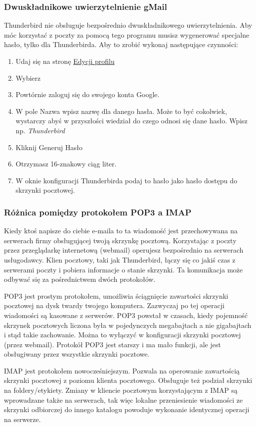 \subsubsection{Dwuskładnikowe uwierzytelnienie gMail}
Thunderbird nie obsługuje bezpośrednio dwuskładnikowego uwierzytelnienia. Aby móc korzystać z poczty za pomocą tego programu musisz wygenerować specjalne hasło, tylko dla Thunderbirda. Aby to zrobić wykonaj następujące czynności:
\begin{enumerate}
\item Udaj się na stronę \href{https://www.google.com/settings/personalinfo}{Edycji profilu}
\item Wybierz 
\item Powtórnie zaloguj się do swojego konta Google.
\item W pole \textcolor{ubuntu_orange}{Nazwa} wpisz nazwę dla danego hasła. Może to być cokolwiek, wystarczy abyś w przyszłości wiedział do czego odnosi się dane hasło. Wpisz np. \textit{Thunderbird}
\item Kliknij \textcolor{ubuntu_orange}{Generuj Hasło}
\item Otrzymasz 16-znakowy ciąg liter. 
\item W oknie konfiguracji Thunderbirda podaj to hasło jako hasło dostępu do skrzynki pocztowej.
\end{enumerate}

\subsubsection{Różnica pomiędzy protokołem POP3 a IMAP}
Kiedy ktoś napisze do ciebie e-maila to ta wiadomość jest przechowywana na serwerach firmy obsługującej twoją skrzynkę pocztową. Korzystając z poczty przez przeglądarkę internetową (webmail) operujesz bezpośrednio na serwerach usługodawcy. Klien pocztowy, taki jak Thunderbird, łączy się co jakiś czas z serwerami poczty i pobiera informacje o stanie skrzynki. Ta komunikacja może odbywać się za pośrednictwem dwóch protokołów.

POP3 jest prostym protokołem, umożliwia ściągnięcie zawartości skrzynki pocztowej na dysk twardy twojego komputera. Zazwyczaj po tej operacji wiadomości są kasowane z serwerów. POP3 powstał w czasach, kiedy pojemność skrzynek pocztowych liczona była w pojedynczych megabajtach a nie gigabajtach i stąd takie zachowanie. Można to wyłączyć w konfiguracji skrzynki pocztowej (przez webmail). Protokół POP3 jest starszy i ma mało funkcji, ale jest obsługiwany przez wszystkie skrzynki pocztowe.

IMAP jest protokołem nowocześniejszym. Pozwala na operowanie zawartością skrzynki pocztowej z poziomu klienta pocztowego. Obsługuje też podział skrzynki na foldery/etykiety. Zmiany w kliencie pocztowym korzystającym z IMAP są wprowadzane także na serwerach, tak więc lokalne przeniesienie wiadomości ze skrzynki odbiorczej do innego katalogu powoduje wykonanie identycznej operacji na serwerze. 
